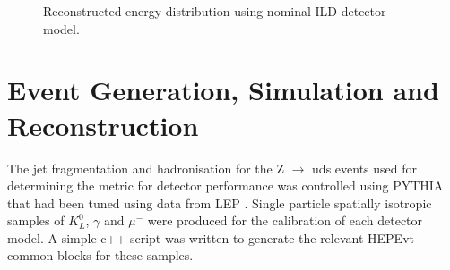 \begin{figure}
\centering
{}
\caption[Reconstructed energy distribution using nominal ILD detector model.]{Reconstructed energy distribution using nominal ILD detector model.}
\label{fig:singleparticleenergyhists}
\end{figure}


\section{Event Generation, Simulation and Reconstruction}

The jet fragmentation and hadronisation for the Z $\rightarrow$ uds events used for determining the metric for detector performance was controlled using PYTHIA \cite{Sjostrand:2006za} that had been tuned using data from LEP \cite{Alexander:1995bk}.  Single particle spatially isotropic samples of $K_{L}^{0}$, $\gamma$ and $\mu^{-}$ were produced for the calibration of each detector model.  A simple c++ script was written to generate the relevant HEPEvt common blocks for these samples. 

